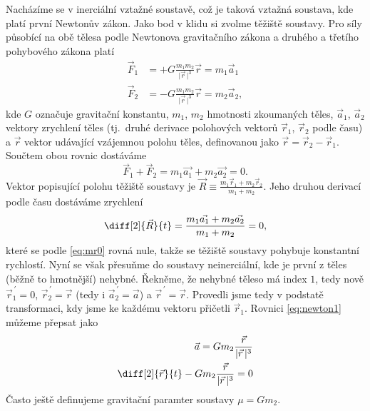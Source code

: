 \documentclass[A4paper, 12pt, oneside]{book}
\newcommand{\ap}{{\,\prime}}
\newcommand{\abs}[1]{\lvert #1 \,\rvert}
\begin{document}
Nacházíme se v inerciální vztažné soustavě, což je taková vztažná soustava, kde platí první Newtonův zákon. Jako bod v klidu si zvolme těžiště soustavy. Pro síly působící na obě tělesa podle Newtonova gravitačního zákona a druhého a třetího pohybového zákona platí
\begin{align} 
	\vec{F}_1 &= +G\frac{m_1m_2}{\abs{\vec{r}}^3}\vec{r} = m_1\vec{a}_1 \label{eq:newton1} \\
	\vec{F}_2 &= -G\frac{m_1m_2}{\abs{\vec{r}}^3}\vec{r} = m_2\vec{a}_2, \label{eq:newton2}
\end{align}
kde $G$ označuje gravitační konstantu, $m_1$, $m_2$ hmotnosti zkoumaných těles, $\vec{a}_1$, $\vec{a}_2$ vektory zrychlení těles (tj.\ druhé derivace polohových vektorů $\vec{r}_1$, $\vec{r}_2$ podle času) a $\vec{r}$ vektor udávající vzájemnou polohu těles, definovanou jako $\vec{r} = \vec{r}_2 - \vec{r}_1$. Součtem obou rovnic dostáváme
\begin{equation} \label{eq:mr0}
	\vec{F}_1 + \vec{F}_2 = m_1\vec{a_1} + m_2\vec{a_2} = 0.
\end{equation}
Vektor popisující polohu těžiště soustavy je $\vec{R} \equiv \frac{m_1\vec{r}_1 + m_2\vec{r}_2}{m_1 + m_2}$. Jeho druhou derivací podle času dostáváme zrychlení
\begin{equation*}
	\diff[2]{\vec{R}}{t} = \frac{m_1\vec{a_1} + m_2\vec{a_2}}{m_1+m_2} = 0,
\end{equation*}
které se podle \eqref{eq:mr0} rovná nule, takže se těžiště soustavy pohybuje konstantní rychlostí.
\newpage
Nyní se však přesuňme do soustavy neinerciální, kde je první z těles (běžně to hmotnější) nehybné. Řekněme, že nehybné těleso má index $1$, tedy nově $\vec{r}^\ap_1=0$, $\vec{r}^\ap_2=\vec{r}$ (tedy i $\vec{a}^\ap_2 = \vec{a}$) a $\vec{r}^\ap=\vec{r}$. Provedli jsme tedy v podstatě transformaci, kdy jsme ke každému vektoru přičetli $\vec{r}_1$.  Rovnici \eqref{eq:newton1} můžeme přepsat jako
\begin{align}
	\nonumber {\vec{a}} = Gm_2\frac{\vec{r}}{\abs{\vec{r}}^3} \\
		\diff[2]{\vec{r}}{t} - Gm_2\frac{\vec{r}}{\abs{\vec{r}}^3} = 0	
\end{align}
Často ještě definujeme gravitační paramter soustavy $\mu=Gm_2$.
\end{document}
